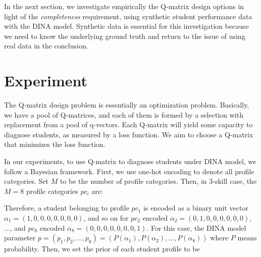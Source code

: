 \documentclass{edm_template}
\newcommand{\Michel}[1]{{\textcolor{purple}{[#1]}}}
\begin{document}
%

In the next section, we investigate empirically the Q-matrix design options in light of the \textit{completeness} requirement, using synthetic student performance data with the DINA model.  Synthetic data is essential for this investigation because we need to know the underlying ground truth and return to the issue of using real data in the conclusion.

\section{Experiment}
The Q-matrix design problem is essentially an optimization problem. Basically, we have a pool of Q-matrices, and each of them is formed by a selection with replacement from a pool of q-vectors. Each Q-matrix will yield some capacity to diagnose students, as measured by a loss function. We aim to choose a Q-matrix that minimizes the loss function.

In our experiments, to use Q-matrix to diagnose students under DINA model, we follow a Bayesian framework. First, we use one-hot encoding to denote all profile categories. Set $M$ to be the number of profile categories. Then, in 3-skill case, the $M=8$ profile categories $pc_i$ are:

\centerline{
}
Therefore, a student belonging to profile $pc_1$ is encoded as a binary unit vector $\alpha_1=(1,0,0,0,0,0,0,0)$, and so on for $pc_2$ encoded $\alpha_2=(0,1,0,0,0,0,0,0)$, ..., and $pc_8$ encoded $\alpha_8=(0,0,0,0,0,0,0,1)$.
For this case, the DINA model parameter $p = (p_1, p_2,..., p_8) = (P(\alpha_1), P(\alpha_2), ..., P(\alpha_8))$ where $P$ means probability.
Then, we set the prior of each student profile to be 
\end{document}
